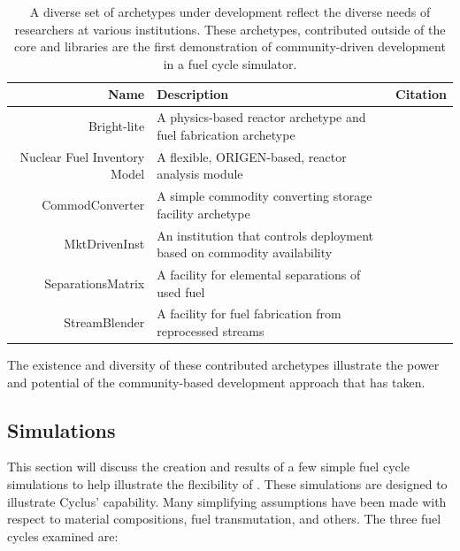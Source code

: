 \begin{table}[h]
\centering
\begin{tabularx}{\textwidth}{|r|X|r|}
\hline
\textbf{Name} & \textbf{Description} & \textbf{Citation} \\
\hline
Bright-lite & A physics-based reactor archetype and fuel fabrication archetype & \cite{flanagan_bright-lite_2014} \\
Nuclear Fuel Inventory Model & A flexible, ORIGEN-based, reactor analysis module & \cite{skutnik_nuclear_2014} \\
CommodConverter & A simple commodity converting storage facility archetype  & \cite{huff_commodconverter_2014} \\
MktDrivenInst & An institution that controls deployment based on commodity availability & \cite{huff_mktdriveninst_2014} \\
SeparationsMatrix & A facility for elemental separations of used fuel & \cite{huff_streamblender_2014} \\
StreamBlender & A facility for fuel fabrication from reprocessed streams & \cite{huff_streamblender_2014} \\
\hline
\end{tabularx}
\caption{A diverse set of archetypes under development reflect the diverse 
needs of researchers at various institutions. These archetypes, contributed 
outside of the \Cyclus core and \Cycamore libraries are the first demonstration 
of community-driven development in a fuel cycle simulator.}
\label{tab:archetypes}
\end{table}

The existence and diversity of these contributed archetypes
illustrate the power and potential of the community-based development approach 
that \Cyclus has taken.

\subsection{Simulations}


This section will discuss the creation and results of a few simple fuel cycle
simulations to help illustrate the flexibility of \Cyclus. These simulations
are designed to illustrate Cyclus' capability.  Many simplifying assumptions
have been made with respect to material compositions, fuel transmutation, and
others. The three fuel cycles examined are:

